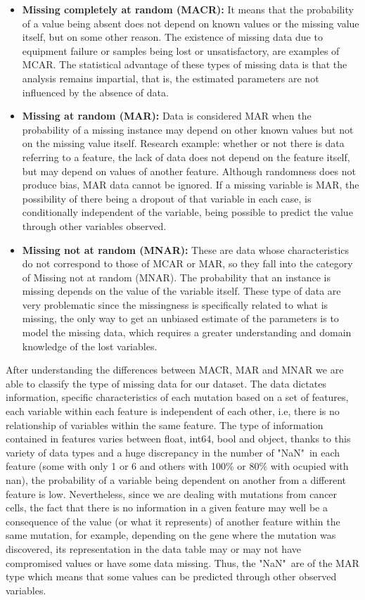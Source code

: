 \begin{itemize}
  \item \textbf{Missing completely at random (MACR):} It means that the probability of a value being absent does not depend on known values or the missing value itself, but on some other reason. The existence of missing data due to equipment failure or samples being lost or unsatisfactory, are examples of MCAR. The statistical advantage of these types of missing data is that the analysis remains impartial, that is, the estimated parameters are not influenced by the absence of data.
  
  \item \textbf{Missing at random (MAR):} Data is considered MAR when the probability of a missing instance may depend on other known values but not on the missing value itself. Research example: whether or not there is data referring to a feature, the lack of data does not depend on the feature itself, but may depend on values of another feature. Although randomness does not produce bias, MAR data cannot be ignored. If a missing variable is MAR, the possibility of there being a dropout of that variable in each case, is conditionally independent of the variable, being possible to predict the value through other variables observed.

  \item \textbf{Missing not at random (MNAR):} These are data whose characteristics do not correspond to those of MCAR or MAR, so they fall into the category of Missing not at random (MNAR). The probability that an instance is missing depends on the value of the variable itself. These type of data are very problematic since the missingness is specifically related to what is missing, the only way to get an unbiased estimate of the parameters is to model the missing data, which requires a greater understanding and domain knowledge of the lost variables.
 
\end{itemize}

After understanding the differences between MACR, MAR and MNAR we are able to classify the type of missing data for our dataset. The data dictates information, specific characteristics of each mutation based on a set of features, each variable within each feature is independent of each other, i.e, there is no relationship of variables within the same feature. The type of information contained in features varies between float, int64, bool and object, thanks to this variety of data types and a huge discrepancy in the number of "NaN"\ in each feature (some with only 1 or 6 and others with 100\% or 80\% with ocupied with nan), the probability of a variable being dependent on another from a different feature is low. Nevertheless, since we are dealing with mutations from cancer cells, the fact that there is no information in a given feature may well be a consequence of the value (or what it represents) of another feature within the same mutation, for example, depending on the gene where the mutation was discovered, its representation in the data table may or may not have compromised values or have some data missing. Thus, the "NaN"\ are of the MAR type which means that some values can be predicted through other observed variables.

